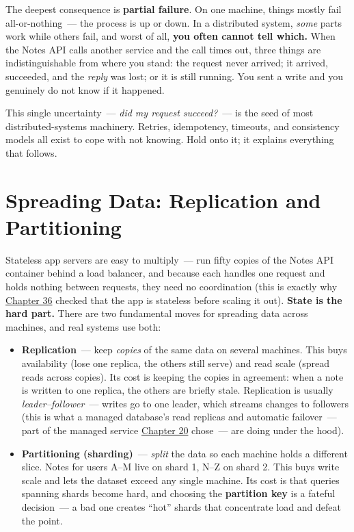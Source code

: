 The deepest consequence is \textbf{partial failure}. On one machine, things mostly fail all-or-nothing~--- the process is up or down. In a distributed system, \emph{some} parts work while others fail, and worst of all, \textbf{you often cannot tell which.} When the Notes API calls another service and the call times out, three things are indistinguishable from where you stand: the request never arrived; it arrived, succeeded, and the \emph{reply} was lost; or it is still running. You sent a write and you genuinely do not know if it happened.

This single uncertainty~--- \emph{did my request succeed?}~--- is the seed of most distributed-systems machinery. Retries, idempotency, timeouts, and consistency models all exist to cope with not knowing. Hold onto it; it explains everything that follows.

\setcounter{section}{2}
\section{Spreading Data: Replication and Partitioning}\label{40-distributed-systems:403-spreading-data-replication-and-partitioning}

Stateless app servers are easy to multiply~--- run fifty copies of the Notes API container behind a load balancer, and because each handles one request and holds nothing between requests, they need no coordination (this is exactly why \hyperref[ch:36-scaling-load]{Chapter 36} checked that the app is stateless before scaling it out). \textbf{State is the hard part.} There are two fundamental moves for spreading data across machines, and real systems use both:

\begin{itemize}
\tightlist
\item
  \textbf{Replication}~--- keep \emph{copies} of the same data on several machines. This buys availability (lose one replica, the others still serve) and read scale (spread reads across copies). Its cost is keeping the copies in agreement: when a note is written to one replica, the others are briefly stale. Replication is usually \emph{leader--follower}~--- writes go to one leader, which streams changes to followers (this is what a managed database's read replicas and automatic failover~--- part of the managed service \hyperref[ch:20-server-fundamentals]{Chapter 20} chose~--- are doing under the hood).
\item
  \textbf{Partitioning (sharding)}~--- \emph{split} the data so each machine holds a different slice. Notes for users A--M live on shard 1, N--Z on shard 2. This buys write scale and lets the dataset exceed any single machine. Its cost is that queries spanning shards become hard, and choosing the \textbf{partition key} is a fateful decision~--- a bad one creates ``hot'' shards that concentrate load and defeat the point.
\end{itemize}

